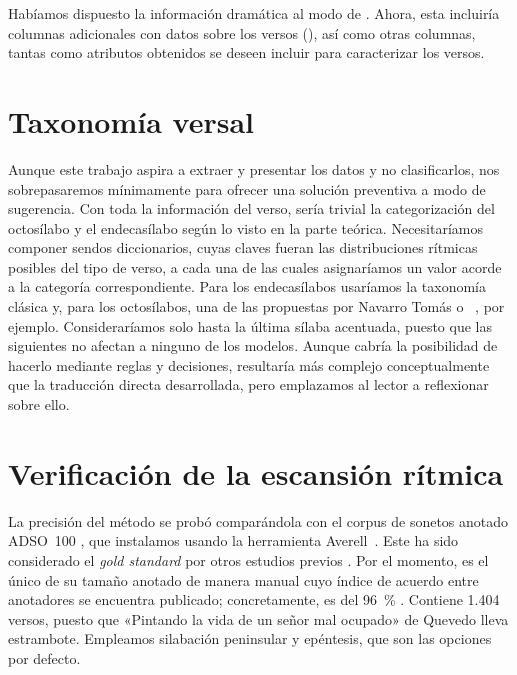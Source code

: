 Habíamos dispuesto la información dramática al modo de . Ahora, esta incluiría columnas adicionales con datos sobre los versos (), así como otras columnas, tantas como atributos obtenidos se deseen incluir para caracterizar los versos. 



\section{Taxonomía versal}

Aunque este trabajo aspira a extraer y presentar los datos y no clasificarlos, nos sobrepasaremos mínimamente para ofrecer una solución preventiva a modo de sugerencia. Con toda la información del verso,  sería trivial la categorización del octosílabo y el endecasílabo según lo visto en la parte teórica. Necesitaríamos componer sendos diccionarios, cuyas claves fueran las distribuciones rítmicas posibles del tipo de verso, a cada una de las cuales asignaríamos un valor acorde a la categoría correspondiente. Para los endecasílabos usaríamos la taxonomía clásica y, para  los octosílabos, una de las propuestas por Navarro Tomás \parencite*[274-275]{navarrotomas1991} o \citeauthor{varela2005}~\parencite*[149-158]{varela2005}, por ejemplo. Consideraríamos solo hasta la última sílaba acentuada, puesto que las siguientes no afectan a ninguno de los modelos.  Aunque cabría la posibilidad de hacerlo mediante reglas y decisiones, resultaría más complejo conceptualmente que la traducción directa desarrollada, pero emplazamos al lector a reflexionar sobre ello.

\section{Verificación de la escansión rítmica}
La precisión del método se probó comparándola con el corpus de sonetos anotado ADSO~100 \parencite{navarrocolorado2017}, que instalamos usando la herramienta Averell~\parencite{diazmedina2021}. Este ha sido considerado el \textit{gold standard} por otros estudios previos \parencite{marco2021}. Por el momento, es el único de su tamaño anotado de manera manual cuyo índice de acuerdo entre anotadores se encuentra publicado; concretamente, es del 96~\% \parencite{marco2021}. Contiene 1{.}404 versos, puesto que «Pintando la vida de un señor mal ocupado» de Quevedo lleva estrambote. Empleamos silabación peninsular y epéntesis, que son las opciones por defecto.

